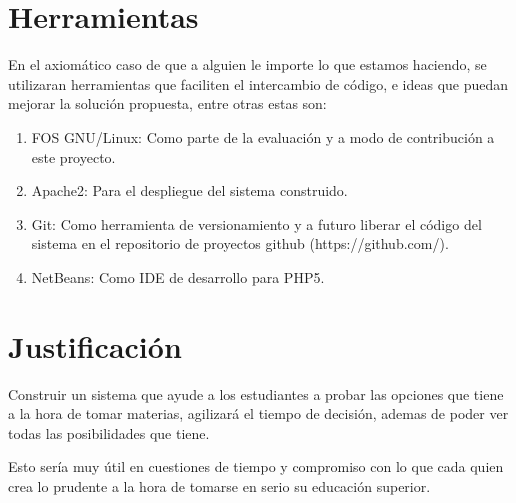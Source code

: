 \documentclass[letter,12pt]{article}
\begin{document}
\section{Herramientas}
En el axiomático caso de que a alguien le importe lo que estamos haciendo, se utilizaran herramientas
que faciliten el intercambio de código, e ideas que puedan mejorar la solución propuesta, entre otras
estas son:

\begin{enumerate}
\item FOS GNU/Linux: Como parte de la evaluación y a modo de contribución a este proyecto.
\item Apache2: Para el despliegue del sistema construido.
\item Git: Como herramienta de versionamiento y a futuro liberar el código del sistema en
el repositorio de proyectos github (https://github.com/).
\item NetBeans: Como IDE de desarrollo para PHP5.
\end{enumerate}

\section{Justificación}
Construir un sistema que ayude a los estudiantes a probar las opciones que tiene a la hora de tomar
materias, agilizará el tiempo de decisión, ademas de poder ver todas las posibilidades que tiene.

Esto sería muy útil en cuestiones de tiempo y compromiso con lo que cada quien crea lo prudente a la
hora de tomarse en serio su educación superior.
\end{document}
